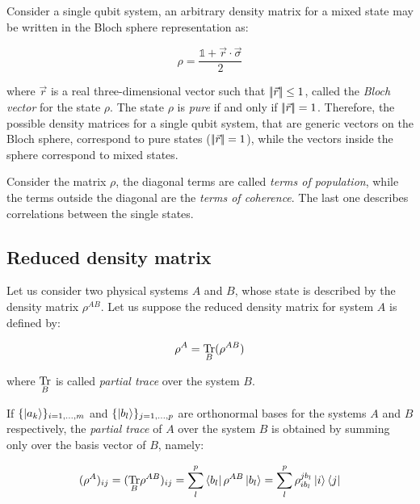 Consider a single qubit system, an arbitrary density matrix for a mixed state may be written in the Bloch sphere representation \cite{Nielsen} as:

 \begin{equation}
\rho = \frac{ \mathbb{1} + \vec{r} \cdot \vec{\sigma} }{2}
\label{8_2_firstchapter}
\end{equation}


\noindent where $\vec{r}$ is a real three-dimensional vector such that ${\left|\!\left|  \vec{r}  \right|\!\right|} \leq 1$, called the \textit{Bloch vector} for the state $\rho$. The state $\rho$ is \textit{pure} if and only if ${\left|\!\left|  \vec{r}  \right|\!\right|} =1$. Therefore, the possible density matrices for a single qubit system, that are generic vectors on the Bloch sphere, correspond to pure states (${\left|\!\left|  \vec{r}  \right|\!\right|} =1$), while the vectors inside the sphere correspond to mixed states.

Consider the matrix $\rho$, the diagonal terms are called \textit{terms of population}, while the terms outside the diagonal are the \textit{terms of coherence}. The last one describes correlations between the single states.




\subsection{Reduced density matrix}

Let us consider two physical systems $A$ and $B$, whose state is described by the density matrix $\rho^{AB}$. Let us suppose the reduced density matrix for system $A$ is defined by:

\begin{equation}
\rho^A = \underset{B}{\operatorname{Tr}}  (\rho^{AB})
 \label{11_firstchapter}
\end{equation}

\noindent where $\underset{B}{\operatorname{Tr}}$ is called \textit{partial trace} over the system $B$.

If $\{ \left| a_k \right \rangle \}_{i=1,\dots,m}$ and $\{ \left| b_l \right \rangle \}_{j=1,\dots,p}$ are orthonormal bases for the systems $A$ and $B$  respectively, the \textit{partial trace} of $A$ over the system $B$ is obtained by summing only over the basis vector of $B$, namely:

\begin{equation}
(\rho^A)_{ij} = ( \underset{B}{\operatorname{Tr}} \rho^{AB} )_{ij} = \sum_l^{p} \left\langle b_l \right | \rho^{AB} \left| b_l \right \rangle = \sum_l^{p} \rho_{i b_l}^{j b_l} \left| i \right \rangle \left\langle j \right |
 \label{12_firstchapter}
\end{equation}


